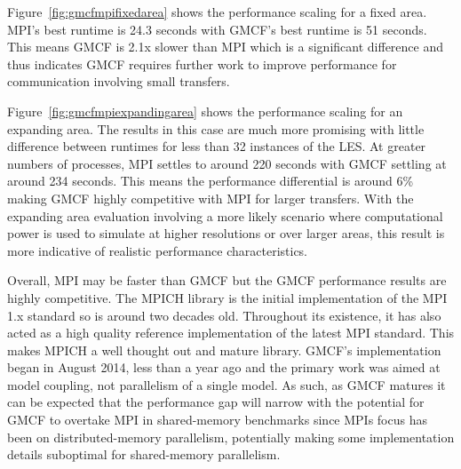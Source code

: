 Figure~\ref{fig:gmcfmpifixedarea} shows the performance scaling for a fixed
area. MPI's best runtime is 24.3 seconds with GMCF's best runtime is 51 seconds.
This means GMCF is 2.1x slower than MPI which is a significant difference and
thus indicates GMCF requires further work to improve performance for
communication involving small transfers.

Figure~\ref{fig:gmcfmpiexpandingarea} shows the performance scaling for an
expanding area. The results in this case are much more promising with little
difference between runtimes for less than 32 instances of the LES. At greater
numbers of processes, MPI settles to around 220 seconds with GMCF settling at
around 234 seconds. This means the performance differential is around 6\% making
GMCF highly competitive with MPI for larger transfers. With the expanding area
evaluation involving a more likely scenario where computational power is used to
simulate at higher resolutions or over larger areas, this result is more
indicative of realistic performance characteristics.

Overall, MPI may be faster than GMCF but the GMCF performance results are highly
competitive. The MPICH library is the initial implementation of the MPI 1.x
standard so is around two decades old. Throughout its existence, it has also
acted as a high quality reference implementation of the latest MPI standard.
This makes MPICH a well thought out and mature library. GMCF's implementation
began in August 2014, less than a year ago and the primary work was aimed at
model coupling, not parallelism of a single model. As such, as GMCF matures it
can be expected that the performance gap will narrow with the potential for GMCF
to overtake MPI in shared-memory benchmarks since MPIs focus has been on
distributed-memory parallelism, potentially making some implementation details
suboptimal for shared-memory parallelism.
